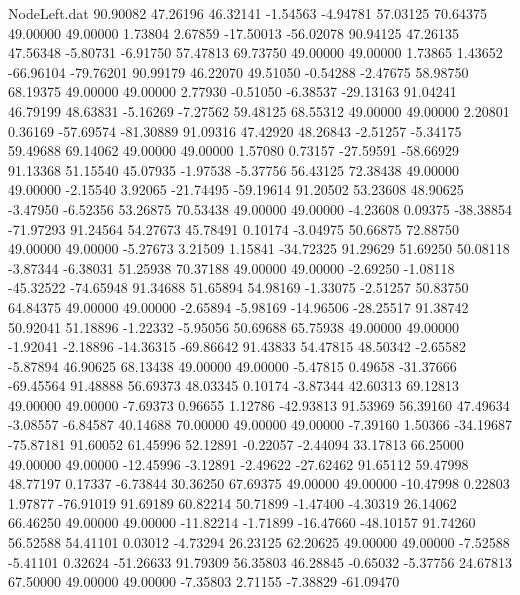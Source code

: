 \begin{filecontents}{NodeLeft.dat}
  90.90082   47.26196   46.32141    -1.54563   -4.94781   57.03125   70.64375   49.00000   49.00000    1.73804    2.67859  -17.50013  -56.02078
  90.94125   47.26135   47.56348    -5.80731   -6.91750   57.47813   69.73750   49.00000   49.00000    1.73865    1.43652  -66.96104  -79.76201
  90.99179   46.22070   49.51050    -0.54288   -2.47675   58.98750   68.19375   49.00000   49.00000    2.77930   -0.51050   -6.38537  -29.13163
  91.04241   46.79199   48.63831    -5.16269   -7.27562   59.48125   68.55312   49.00000   49.00000    2.20801    0.36169  -57.69574  -81.30889
  91.09316   47.42920   48.26843    -2.51257   -5.34175   59.49688   69.14062   49.00000   49.00000    1.57080    0.73157  -27.59591  -58.66929
  91.13368   51.15540   45.07935    -1.97538   -5.37756   56.43125   72.38438   49.00000   49.00000   -2.15540    3.92065  -21.74495  -59.19614
  91.20502   53.23608   48.90625    -3.47950   -6.52356   53.26875   70.53438   49.00000   49.00000   -4.23608    0.09375  -38.38854  -71.97293
  91.24564   54.27673   45.78491     0.10174   -3.04975   50.66875   72.88750   49.00000   49.00000   -5.27673    3.21509    1.15841  -34.72325
  91.29629   51.69250   50.08118    -3.87344   -6.38031   51.25938   70.37188   49.00000   49.00000   -2.69250   -1.08118  -45.32522  -74.65948
  91.34688   51.65894   54.98169    -1.33075   -2.51257   50.83750   64.84375   49.00000   49.00000   -2.65894   -5.98169  -14.96506  -28.25517
  91.38742   50.92041   51.18896    -1.22332   -5.95056   50.69688   65.75938   49.00000   49.00000   -1.92041   -2.18896  -14.36315  -69.86642
  91.43833   54.47815   48.50342    -2.65582   -5.87894   46.90625   68.13438   49.00000   49.00000   -5.47815    0.49658  -31.37666  -69.45564
  91.48888   56.69373   48.03345     0.10174   -3.87344   42.60313   69.12813   49.00000   49.00000   -7.69373    0.96655    1.12786  -42.93813
  91.53969   56.39160   47.49634    -3.08557   -6.84587   40.14688   70.00000   49.00000   49.00000   -7.39160    1.50366  -34.19687  -75.87181
  91.60052   61.45996   52.12891    -0.22057   -2.44094   33.17813   66.25000   49.00000   49.00000  -12.45996   -3.12891   -2.49622  -27.62462
  91.65112   59.47998   48.77197     0.17337   -6.73844   30.36250   67.69375   49.00000   49.00000  -10.47998    0.22803    1.97877  -76.91019
  91.69189   60.82214   50.71899    -1.47400   -4.30319   26.14062   66.46250   49.00000   49.00000  -11.82214   -1.71899  -16.47660  -48.10157
  91.74260   56.52588   54.41101     0.03012   -4.73294   26.23125   62.20625   49.00000   49.00000   -7.52588   -5.41101    0.32624  -51.26633
  91.79309   56.35803   46.28845    -0.65032   -5.37756   24.67813   67.50000   49.00000   49.00000   -7.35803    2.71155   -7.38829  -61.09470

\end{filecontents}
